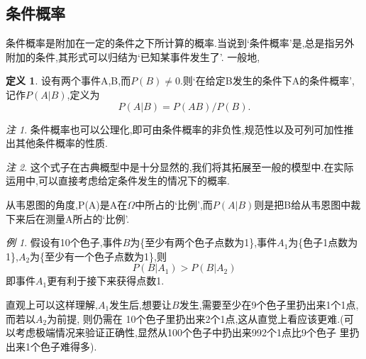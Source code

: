 \documentclass[a4paper,11pt]{article}%
\theoremstyle{remark}
\newtheorem*{remark}{注}
\theoremstyle{remark}
\newtheorem*{example}{例}
\theoremstyle{definition}
\theoremstyle{definition}
\newtheorem*{definition}{定义}
\theoremstyle{plain}
\begin{document}
\subsection{条件概率}
条件概率是附加在一定的条件之下所计算的概率.当说到`条件概率'是,总是指另外附加的条件,其形式可以归结为`已知某事件发生了'.
一般地,
\begin{definition}
    设有两个事件A,B,而$P(B)\neq 0$.则`在给定B发生的条件下A的条件概率',记作$P(A|B)$,定义为
    \[P(A|B)=P(AB)/P(B).\]
\end{definition}
\begin{remark}
    条件概率也可以公理化,即可由条件概率的非负性,规范性以及可列可加性推出其他条件概率的性质.
\end{remark}
\begin{remark}
    这个式子在古典概型中是十分显然的,我们将其拓展至一般的模型中.在实际运用中,可以直接考虑给定条件发生的情况下的概率.

    从韦恩图的角度,P(A)是A在$\Omega$中所占的`比例',而$P(A|B)$则是把B给从韦恩图中裁下来后在测量A所占的`比例'.
\end{remark}
\begin{example}
    假设有10个色子,事件$B$为\{至少有两个色子点数为1\},事件$A_1$为\{色子1点数为1\},$A_2$为\{至少有一个色子点数为1\},则 
    \[P(B|A_1)>P(B|A_2)\]
    即事件$A_1$更有利于接下来获得点数1.

    直观上可以这样理解,$A_1$发生后,想要让$B$发生,需要至少在9个色子里扔出来1个1点,而若以$A_2$为前提,
    则仍需在 10个色子里扔出来2个1点,这从直觉上看应该更难.(可以考虑极端情况来验证正确性,显然从100个色子中扔出来992个1点比9个色子
    里扔出来1个色子难得多).

\end{example}
\end{document}
